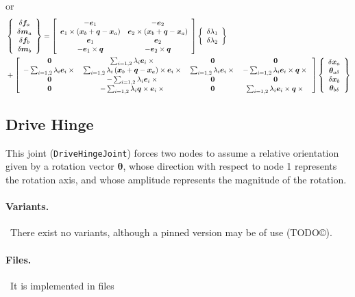 \documentclass[10pt,fleqn,subeqn]{report}
\newcommand{\T}[1]{\bm{#1}}
\newcommand{\TT}[1]{\bm{#1}}
\begin{document}
or
\begin{align}
	&\cubr{\cvvect{
		\delta\T{f}_a
		\\
		\delta\T{m}_a
		\\
		\delta\T{f}_b
		\\
		\delta\T{m}_b
	}}
	=
	\sqbr{\matr{cc}{
		-\T{e}_1 & -\T{e}_2
		\\
		\T{e}_1 \times \plbr{\T{x}_b + \T{q} - \T{x}_a} & \T{e}_2 \times \plbr{\T{x}_b + \T{q} - \T{x}_a}
		\\
		\T{e}_1 & \T{e}_2
		\\
		-\T{e}_1 \times \T{q} & -\T{e}_2 \times \T{q}
	}} \cubr{\cvvect{
		\delta\lambda_1
		\\
		\delta\lambda_2
	}}
	\nonumber \\
	&\mbox{}+ \sqbr{\matr{cccc}{
		\TT{0} & \sum_{i=1,2} \lambda_i \T{e}_i\times{} & \TT{0} & \TT{0}
		\\
		-\sum_{i=1,2} \lambda_i \T{e}_i\times{}
			& \sum_{i=1,2} \lambda_i \plbr{\T{x}_b + \T{q} - \T{x}_a} \times \T{e}_i\times{}
			& \sum_{i=1,2} \lambda_i \T{e}_i\times{}
			& -\sum_{i=1,2} \lambda_i \T{e}_i\times\T{q}\times{}
		\\
		\TT{0} & -\sum_{i=1,2} \lambda_i \T{e}_i\times{} & \TT{0} & \TT{0}
		\\
		\TT{0}
			& -\sum_{i=1,2} \lambda_i \T{q}\times\T{e}_i\times{}
			& \TT{0}
			& \sum_{i=1,2} \lambda_i \T{e}_i\times\T{q}\times{}
	}} \cubr{\cvvect{
		\delta\T{x}_a
		\\
		\T{\theta}_{a\delta}
		\\
		\delta\T{x}_b
		\\
		\T{\theta}_{b\delta}
	}}
\end{align}


\subsection{Drive Hinge}
This joint (\texttt{DriveHingeJoint}) forces two nodes to assume a relative orientation
given by a rotation vector $\T{\theta}$, whose direction with respect
to node 1 represents the rotation axis, and whose amplitude represents 
the magnitude of the rotation.

\paragraph{Variants.} \
There exist no variants, although a pinned version may be of use (TODO\copyright).

\paragraph{Files.} \
It is implemented in files
\end{document}
